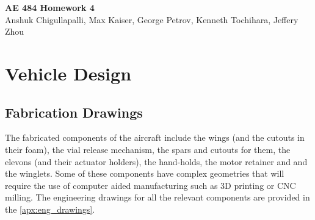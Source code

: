 




\begin{center}
    {\Large\textbf{AE 484 Homework 4}}\\
    Anshuk Chigullapalli, Max Kaiser, George Petrov, Kenneth Tochihara, Jeffery Zhou\\
\end{center}

\section{Vehicle Design}

    \subsection{Fabrication Drawings}
    
        The fabricated components of the aircraft include the  wings (and the cutouts in their foam), the vial release mechanism, the spars and cutouts for them, the elevons (and their actuator holders), the hand-holds, the motor retainer and and the winglets. Some of these components have complex geometries that will require the use of computer aided manufacturing such as 3D printing or CNC milling. The engineering drawings for all the relevant components are provided in the \ref{apx:eng_drawings}.
    
